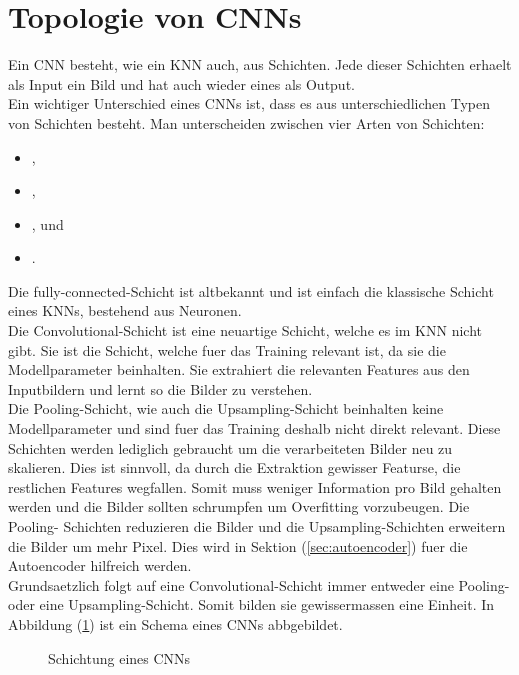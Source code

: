 \section{Topologie von CNNs}
Ein CNN besteht, wie ein KNN auch, aus Schichten. Jede dieser Schichten erhaelt
als Input ein Bild und hat auch wieder eines als Output. \\
Ein wichtiger Unterschied eines CNNs ist, dass es aus unterschiedlichen Typen von
Schichten besteht. Man unterscheiden zwischen vier Arten von Schichten:
\begin{itemize}
\item{,}
\item{,}
\item{, und}
\item{.}
\end{itemize}
Die fully-connected-Schicht ist altbekannt und ist einfach die klassische Schicht
eines KNNs, bestehend aus Neuronen. \\
Die Convolutional-Schicht ist eine neuartige Schicht, welche es im KNN nicht
gibt. Sie ist die Schicht, welche fuer das Training relevant ist,
da sie die Modellparameter beinhalten. Sie extrahiert die relevanten Features
aus den Inputbildern und lernt so die Bilder zu verstehen. \\
Die Pooling-Schicht, wie auch die Upsampling-Schicht beinhalten keine
Modellparameter und sind fuer das Training deshalb nicht direkt relevant.
Diese Schichten werden lediglich gebraucht um die verarbeiteten Bilder neu zu
skalieren. Dies ist sinnvoll, da durch die Extraktion gewisser Featurse, die
restlichen Features wegfallen. Somit muss weniger Information pro Bild gehalten
werden und die Bilder sollten schrumpfen um Overfitting vorzubeugen. Die Pooling-
Schichten reduzieren die Bilder und die Upsampling-Schichten erweitern die
Bilder um mehr Pixel. Dies wird in Sektion (\ref{sec:autoencoder}) fuer die Autoencoder
hilfreich werden. \\
Grundsaetzlich folgt auf eine Convolutional-Schicht immer entweder eine Pooling-
oder eine Upsampling-Schicht. Somit bilden sie gewissermassen eine Einheit.
\para{}
In Abbildung (\ref{fig:cnn_topology}) ist ein Schema eines CNNs abbgebildet.
\begin{figure}[h!]

  \caption{Schichtung eines CNNs}
  \label{fig:cnn_topology}
\end{figure}



